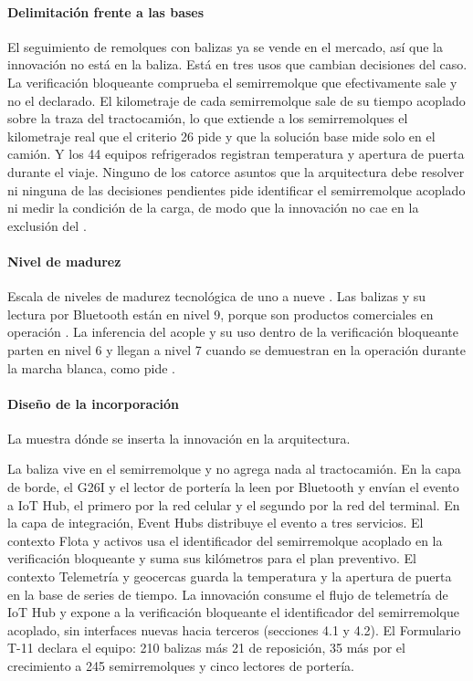 \paragraph{Delimitación frente a las bases} El seguimiento de remolques con balizas ya se vende en el
mercado, así que la innovación no está en la baliza. Está en tres usos que cambian decisiones del caso.
La verificación bloqueante comprueba el semirremolque que efectivamente sale y no el declarado. El
kilometraje de cada semirremolque sale de su tiempo acoplado sobre la traza del tractocamión, lo que
extiende a los semirremolques el kilometraje real que el criterio 26 pide y que la solución base mide
solo en el camión. Y los 44 equipos refrigerados registran temperatura y apertura de puerta durante el
viaje. Ninguno de los catorce asuntos que la arquitectura debe resolver  ni
ninguna de las decisiones pendientes  pide identificar el semirremolque
acoplado ni medir la condición de la carga, de modo que la innovación no cae en la exclusión del
.

\paragraph{Nivel de madurez} Escala de niveles de madurez tecnológica de uno a nueve
\parencite{iso16290}. Las balizas y su lectura por Bluetooth están en nivel 9, porque son productos
comerciales en operación \parencite{teltonika_eye,minew_g1}. La inferencia del acople y su uso dentro
de la verificación bloqueante parten en nivel 6 y llegan a nivel 7 cuando se demuestran en la operación
durante la marcha blanca, como pide .

\paragraph{Diseño de la incorporación} La  muestra dónde se inserta la
innovación en la arquitectura.


La baliza vive en el semirremolque y no agrega nada al tractocamión. En la capa de borde, el G26I y el
lector de portería la leen por Bluetooth y envían el evento a IoT Hub, el primero por la red celular y
el segundo por la red del terminal. En la capa de integración, Event Hubs distribuye el evento a tres
servicios. El contexto Flota y activos usa el identificador del semirremolque acoplado en la
verificación bloqueante y suma sus kilómetros para el plan preventivo. El contexto Telemetría y
geocercas guarda la temperatura y la apertura de puerta en la base de series de tiempo. La innovación
consume el flujo de telemetría de IoT Hub y expone a la verificación bloqueante el identificador del
semirremolque acoplado, sin interfaces nuevas hacia terceros (secciones 4.1 y 4.2). El Formulario T-11
declara el equipo: 210 balizas más 21 de reposición, 35 más por el crecimiento a 245 semirremolques y
cinco lectores de portería.

